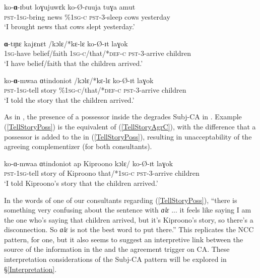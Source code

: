 \documentclass[output=paper,newtxmath,modfonts,nonflat,hidelinks]{langsci/langscibook}
\begin{document}
\ea 
\begin{xlist}

\ex 
\gll ko-\textbf{ɑ}-ɪbut loɣujuwɛk  ko-\O-ɾuuja tuɣa amut \\
\textsc{pst}-1\textsc{sg}-bring news \%1\textsc{sg-c} \textsc{pst}-3-sleep cows yesterday\\
\glt `I brought news that cows slept yesterday.' 

\ex
\gll \textbf{ɑ}-tɪɲɛ kajɛnɛt /kɔlɛ/*kɛ-lɛ ko-\O-ɪt laɣok \\
1\textsc{sg}-have belief/faith 1\textsc{sg-c}/that/*\textsc{def}-\textsc{c} \textsc{pst}-3-arrive children \\
\glt `I have belief/faith that the children arrived.'

\ex \label{TellStoryAgrC}
\gll ko-\textbf{ɑ}-mwaa ɑtindoniot /kɔlɛ/*kɛ-lɛ ko-\O-ɪt laɣok \\
\textsc{pst}-1\textsc{sg}-tell story \%1\textsc{sg-c}/that/*\textsc{def}-\textsc{c} \textsc{pst}-3-arrive children \\
\glt `I told the story that the children arrived.'

\end{xlist}
\z

\noindent As in , the presence of a possessor inside the  degrades Subj-CA in . Example (\ref{TellStoryPoss}) is the equivalent of (\ref{TellStoryAgrC}), with the difference that a possessor is added to the  in (\ref{TellStoryPoss}), resulting in unacceptability of the agreeing complementizer (for both consultants).

\ea \label{TellStoryPoss}

\gll ko-ɑ-mwaa ɑtindoniot ap Kiproono kɔlɛ/ ko-\O-ɪt laɣok \\
\textsc{pst}-1\textsc{sg}-tell story of Kiproono that/*1\textsc{sg-c} \textsc{pst}-3-arrive children \\
\glt `I told Kiproono's story that the children arrived.'

\z

\noindent In the words of one of our consultants regarding (\ref{TellStoryPoss}), ``there is something very confusing about the sentence with \textit{ɑlɛ} ... it feels like saying I am the one who's saying that children arrived, but it's Kiproono's story, so there's a disconnection. So \textit{ɑlɛ} is not the best word to put there.'' This replicates the  NCC pattern, for one, but it also seems to suggest an interpretive link between the source of the information in the  and the agreement trigger on CA. These interpretation considerations of the Subj-CA pattern will be explored in \S \ref{Interpretation}.
\end{document}
